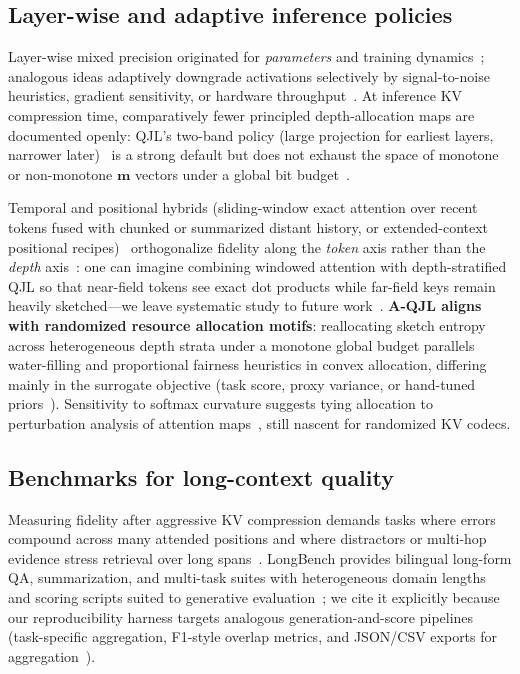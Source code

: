 \documentclass[conference]{IEEEtran}
\begin{document}
\subsection{Layer-wise and adaptive inference policies}

Layer-wise mixed precision originated for \emph{parameters} and training dynamics~\cite{fpguide2018}; analogous ideas adaptively downgrade activations selectively by signal-to-noise heuristics, gradient sensitivity, or hardware throughput~\cite{fpguide2018}. At inference KV compression time, comparatively fewer principled depth-allocation maps are documented openly: QJL's two-band policy (large projection for earliest layers, narrower later)~\cite{zandieh2024qjl} is a strong default but does not exhaust the space of monotone or non-monotone \(\mathbf{m}\) vectors under a global bit budget~\cite{zandieh2024aqjl-repo}.

Temporal and positional hybrids (sliding-window exact attention over recent tokens fused with chunked or summarized distant history, or extended-context positional recipes)~\cite{longrope2024} orthogonalize fidelity along the \emph{token} axis rather than the \emph{depth} axis~\cite{presentation_mqjl}: one can imagine combining windowed attention with depth-stratified QJL so that near-field tokens see exact dot products while far-field keys remain heavily sketched---we leave systematic study to future work~\cite{longrope2024,zandieh2024qjl}. \textbf{A-QJL aligns with randomized resource allocation motifs}: reallocating sketch entropy across heterogeneous depth strata under a monotone global budget parallels water-filling and proportional fairness heuristics in convex allocation, differing mainly in the surrogate objective (task score, proxy variance, or hand-tuned priors~\cite{presentation_mqjl}). Sensitivity to softmax curvature suggests tying allocation to perturbation analysis of attention maps~\cite{vitspec2021}, still nascent for randomized KV codecs.

\subsection{Benchmarks for long-context quality}

Measuring fidelity after aggressive KV compression demands tasks where errors compound across many attended positions and where distractors or multi-hop evidence stress retrieval over long spans~\cite{bai2023longbench}. LongBench provides bilingual long-form QA, summarization, and multi-task suites with heterogeneous domain lengths and scoring scripts suited to generative evaluation~\cite{bai2023longbench}; we cite it explicitly because our reproducibility harness targets analogous generation-and-score pipelines (task-specific aggregation, F1-style overlap metrics, and JSON/CSV exports for aggregation~\cite{presentation_mqjl}).
\end{document}
